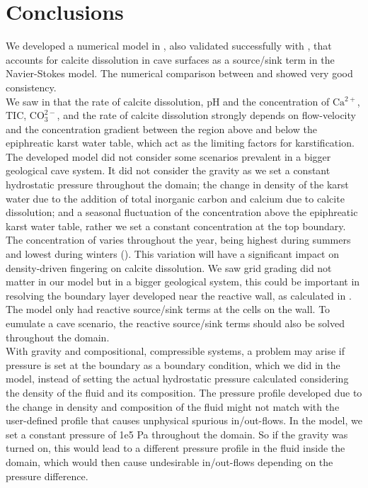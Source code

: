 \chapter{Conclusions} \label{chapter:conclusions}
\thispagestyle{empty}
We developed a numerical model in \DuMuX, also validated successfully with \MATLAB, that accounts for calcite dissolution 
in cave surfaces as a source/sink term in the Navier-Stokes model. The numerical 
comparison between \DuMuX and \MATLAB showed very good consistency.\\

We saw in  that the rate of calcite dissolution, pH and the 
concentration of $\mathrm{{Ca^{2+}}}$, $\mathrm{{TIC}}$, $\mathrm{{CO_3^{2-}}}$, and the rate of calcite dissolution strongly depends on 
flow-velocity and the concentration gradient between the region above and below the epiphreatic karst water table, which 
act as the limiting factors for karstification. \\

The developed model did not consider some scenarios prevalent in a bigger geological cave system. It did not consider the gravity 
as we set a constant hydrostatic pressure throughout the domain; the change in density of the karst water due to the addition of total inorganic carbon 
and calcium due to calcite dissolution; and a seasonal fluctuation of the  concentration above the epiphreatic karst water table, 
rather we set a constant concentration at the top boundary. The concentration of  varies throughout the year, being highest during summers and lowest during 
winters (). This variation will have a significant impact on density-driven fingering on calcite dissolution. 
We saw grid grading did not matter in our model but in a bigger geological system, this could be important in resolving the boundary layer 
developed near the reactive wall, as calculated in . The \DuMuX model only had reactive source/sink terms at the cells on the wall. 
To eumulate a cave scenario, the reactive source/sink terms should also be solved throughout the domain. \\

With gravity and compositional, compressible systems, a problem may arise if pressure is set at the boundary as a boundary condition, 
which we did in the \DuMuX model, instead of setting the actual hydrostatic pressure calculated considering the density of the fluid and its composition. 
The pressure profile developed due to the change in density and composition of the fluid might not match with the 
user-defined profile that causes unphysical spurious in/out-flows. 
In the \DuMuX model, we set a constant pressure of 1e5 Pa throughout the domain. So if the gravity was turned on, this would lead to a different 
pressure profile in the fluid inside the domain, which would then cause undesirable in/out-flows depending on the pressure 
difference. \\

